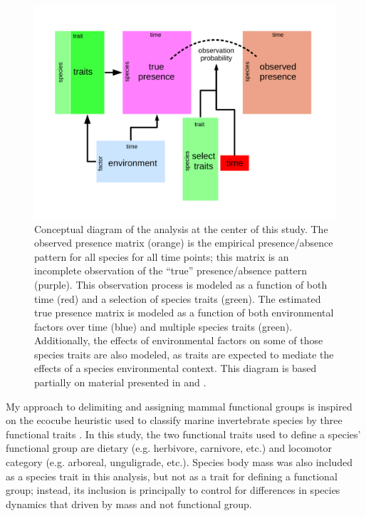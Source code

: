 \documentclass[12pt,letterpaper]{article}
\begin{document}
\begin{figure}[ht]
  \centering
  \includegraphics[width=\textwidth,height=0.4\textheight,keepaspectratio=true]{figure/paleo_fourth_corner}
  \caption[Conceptual diagram of the analysis conducted in this study]{Conceptual diagram of the analysis at the center of this study. The observed presence matrix (orange) is the empirical presence/absence pattern for all species for all time points; this matrix is an incomplete observation of the ``true'' presence/absence pattern (purple). This observation process is modeled as a function of both time (red) and a selection of species traits (green). The estimated true presence matrix is modeled as a function of both environmental factors over time (blue) and multiple species traits (green). Additionally, the effects of environmental factors on some of those species traits are also modeled, as traits are expected to mediate the effects of a species environmental context. This diagram is based partially on material presented in \citet{Brown2014c} and \citet{Warton2015a}.}
  \label{fig:concept_fourth_corner}
\end{figure}

My approach to delimiting and assigning mammal functional groups is inspired on the ecocube heuristic used to classify marine invertebrate species by three functional traits \citep{Bush2007,Bambach2007,Bush2011,Bush2012b,Novack-Gottshall2007,Villeger2011}. In this study, the two functional traits used to define a species' functional group are dietary (e.g. herbivore, carnivore, etc.) and locomotor category (e.g. arboreal, unguligrade, etc.). Species body mass was also included as a species trait in this analysis, but not as a trait for defining a functional group; instead, its inclusion is principally to control for differences in species dynamics that driven by mass and not functional group.
\end{document}
